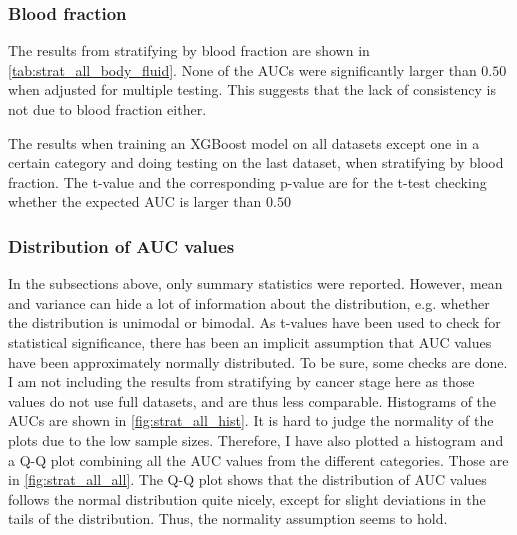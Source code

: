 {{{{{{{{{{{{\subsubsection{Blood fraction}
The results from stratifying by blood fraction are shown in \autoref{tab:strat_all_body_fluid}. None of the AUCs were significantly larger than $0.50$ when adjusted for multiple testing. This suggests that the lack of consistency is not due to blood fraction either.

\begin{table}
    \caption{The results when training an XGBoost model on all datasets except one in a certain category and doing testing on the last dataset, when stratifying by blood fraction. The t-value and the corresponding p-value are for the t-test checking whether the expected AUC is larger than $0.50$}
    \label{tab:strat_all_body_fluid}
    \begin{center}
    \end{center}
\end{table}

\subsubsection{Distribution of AUC values}
In the subsections above, only summary statistics were reported. However, mean and variance can hide a lot of information about the distribution, e.g. whether the distribution is unimodal or bimodal. As t-values have been used to check for statistical significance, there has been an implicit assumption that AUC values have been approximately normally distributed. To be sure, some checks are done. I am not including the results from stratifying by cancer stage here as those values do not use full datasets, and are thus less comparable. Histograms of the AUCs are shown in \autoref{fig:strat_all_hist}. It is hard to judge the normality of the plots due to the low sample sizes. Therefore, I have also plotted a histogram and a Q-Q plot combining all the AUC values from the different categories. Those are in \autoref{fig:strat_all_all}. The Q-Q plot shows that the distribution of AUC values follows the normal distribution quite nicely, except for slight deviations in the tails of the distribution. Thus, the normality assumption seems to hold.

}}}}}}}}}}}}
